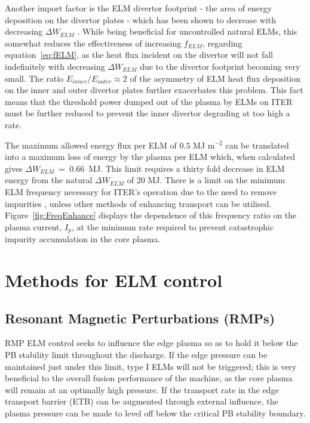 \documentclass[11pt, twocolumn]{article}  %
\begin{document}
Another import factor is the ELM divertor footprint - the area of energy deposition on the divertor plates - which has been shown to decrease with decreasing $\Delta W_{ELM}$ \cite{Eich2011}. While being beneficial for uncontrolled natural ELMs, this somewhat reduces the effectiveness of increasing $f_{ELM}$, regarding equation~\ref{eq:fELM}, as the heat flux incident on the divertor will not fall indefinitely with decreasing $\Delta W_{ELM}$ due to the divertor footprint becoming very small. The ratio $E_{inner}/E_{outer} \approx 2$ \cite{Eich2007} of the asymmetry of ELM heat flux deposition on the inner and outer divertor plates further exacerbates this problem. This fact means that the threshold power dumped out of the plasma by ELMs on ITER must be further reduced to prevent the inner divertor degrading at too high a rate.

The maximum allowed energy flux per ELM of $0.5$ MJ m$^{-2}$ can be translated into a maximum loss of energy by the plasma per ELM which, when calculated gives $\Delta W_{ELM}~=~0.66$~MJ\cite{Loarte2010conf}. This limit requires a thirty fold decrease in ELM energy from the natural $\Delta W_{ELM}$ of 20 MJ. There is a limit on the minimum ELM frequency necessary for ITER's operation due to the need to remove impurities \cite{Loarte2014a}, unless other methods of enhancing transport can be utilised. Figure~\ref{fig:FreqEnhance} displays the dependence of this frequency ratio on the plasma current, $I_p$, at the minimum rate required to prevent catastrophic impurity accumulation in the core plasma.

\section{Methods for ELM control}\label{sec:Control}

\subsection{Resonant Magnetic Perturbations (RMPs)}\label{ssec:RMP}
RMP ELM control seeks to influence the edge plasma so as to hold it below the PB stability limit throughout the discharge. If the edge pressure can be maintained just under this limit, type I ELMs will not be triggered; this is very beneficial to the overall fusion performance of the machine, as the core plasma will remain at an optimally high pressure. If the transport rate in the edge transport barrier (ETB) can be augmented through external influence, the plasma pressure can be made to level off below the critical PB stability boundary. 
\end{document}
